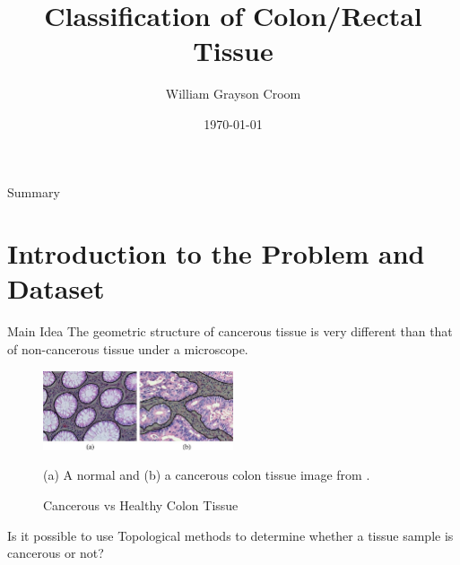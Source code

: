 \documentclass[11pt]{beamer}
\author{William Grayson Croom}
\title{Classification of Colon/Rectal Tissue}
\institute[]{The University of Texas at Dallas \par Mathematical Sciences}
\date{\today}
\begin{document}
\begin{frame}
\titlepage
\end{frame}

\begin{frame}{Summary}
\tableofcontents 
\end{frame}

\section{Introduction to the Problem and Dataset}
    

\begin{frame}{Main Idea}
    The geometric structure of cancerous tissue is very different than that of non-cancerous tissue under a microscope. 
    
    \begin{figure}
        \caption{Cancerous vs Healthy Colon Tissue}
        \label{fig:logo_UFES}
        \centering
        \includegraphics[width=0.5\textwidth]{imagens/cancerous-tissue-image.png}
        
        \medskip
        
        (a) A normal and (b) a cancerous colon tissue image from \cite{tissueImageArticle}. 
    \end{figure}
    
    \vspace{5mm}
    
    Is it possible to use Topological methods to determine whether a tissue sample is cancerous or not?

    \vspace{5mm}
    
\end{frame}
\end{document}
